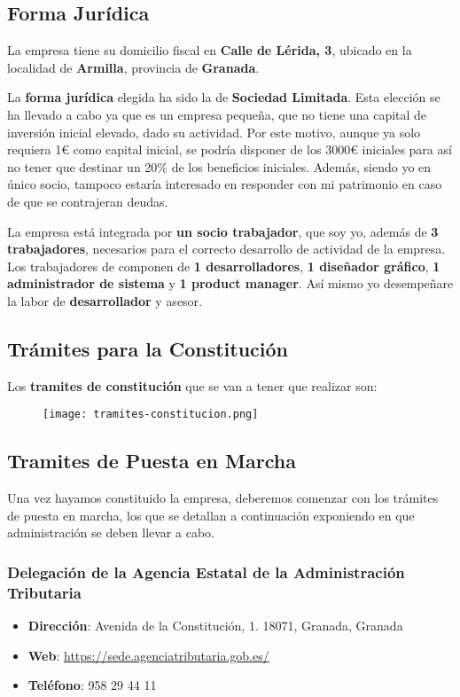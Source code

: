 \subsection{Forma Jurídica}
La empresa tiene su domicilio fiscal en \textbf{Calle de Lérida, 3}, ubicado en la localidad de \textbf{Armilla}, provincia de \textbf{Granada}.

La \textbf{forma jurídica} elegida ha sido la de \textbf{Sociedad Limitada}. Esta elección se ha llevado a cabo ya que es un empresa pequeña, que no tiene una capital de inversión inicial elevado, dado su actividad. Por este motivo, aunque ya solo requiera 1€ como capital inicial, se podría disponer de los 3000€ iniciales para así no tener que destinar un 20\% de los beneficios iniciales. Además, siendo yo en único socio, tampoco estaría interesado en responder con mi patrimonio en caso de que se contrajeran deudas.

La empresa está integrada por \textbf{un socio trabajador}, que soy yo, además de \textbf{3 trabajadores}, necesarios para el correcto desarrollo de actividad de la empresa. Los trabajadores de componen de \textbf{1 desarrolladores}, \textbf{1 diseñador gráfico}, \textbf{1 administrador de sistema} y \textbf{1 product manager}. Así mismo yo desempeñare la labor de \textbf{desarrollador} y {asesor}.

\subsection{Trámites para la Constitución}
Los\textbf{ tramites de constitución} que se van a tener que realizar son:
\begin{figure}[H]
    \centering
    \texttt{[image: tramites-constitucion.png]}
\end{figure}

\subsection{Tramites de Puesta en Marcha}
Una vez hayamos constituido la empresa, deberemos comenzar con los trámites de puesta en marcha, los que se detallan a continuación exponiendo en que administración se deben llevar a cabo.

\subsubsection*{Delegación de la Agencia Estatal de la Administración Tributaria}
\begin{itemize}
    \item \textbf{Dirección}: Avenida de la Constitución, 1. 18071, Granada, Granada
    \item \textbf{Web}: \url{https://sede.agenciatributaria.gob.es/}
    \item \textbf{Teléfono}: 958 29 44 11
\end{itemize}

